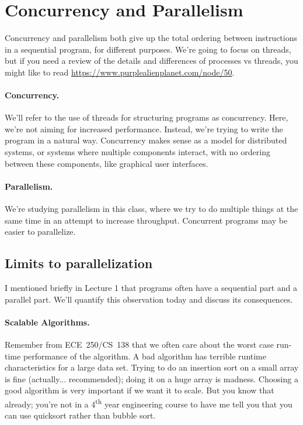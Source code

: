\documentclass[a4paper]{report}
\begin{document}
\section*{Concurrency and Parallelism}
Concurrency and parallelism both give up the
total ordering between instructions in a sequential program, for
different purposes. We're going to focus on threads, but if you need a review of the details and differences of processes vs threads, you might like to read   \url{https://www.purplealienplanet.com/node/50}. 

\paragraph{Concurrency.} We'll refer to the use of threads for
structuring programs as concurrency. Here, we're not aiming
for increased performance. Instead, we're trying to write the program
in a natural way. Concurrency makes sense as a model for distributed
systems, or systems where multiple components interact, with no ordering
between these components, like graphical user interfaces.

\paragraph{Parallelism.} We're studying parallelism in this class, where
we try to do multiple things at the same time in an attempt to increase
throughput. Concurrent programs may be easier to parallelize.

\subsection*{Limits to parallelization}
I mentioned briefly in Lecture 1 that programs often have a sequential
part and a parallel part. We'll quantify this observation today
and discuss its consequences.

\paragraph{Scalable Algorithms.} 
Remember from ECE~250/CS~138 that we often care about the worst case run-time performance of the algorithm. A bad algorithm has terrible runtime characteristics for a large data set. Trying to do an insertion sort on a small array is fine (actually... recommended); doing it on a huge array is madness. Choosing a good algorithm is very important if we want it to scale.  But you know that already; you're not in a 4\textsuperscript{th} year engineering course to have me tell you that you can use quicksort rather than bubble sort.
\end{document}
